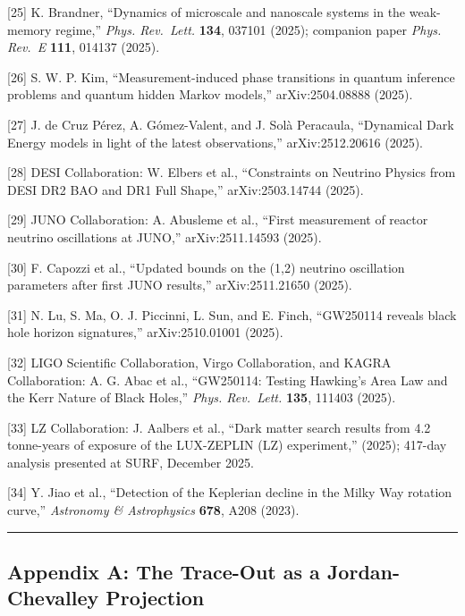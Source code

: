 \documentclass[
  11pt,
]{article}
\begin{document}
{[}25{]} K. Brandner, ``Dynamics of microscale and nanoscale systems in
the weak-memory regime,'' \emph{Phys. Rev.~Lett.} \textbf{134}, 037101
(2025); companion paper \emph{Phys. Rev.~E} \textbf{111}, 014137 (2025).

{[}26{]} S. W. P. Kim, ``Measurement-induced phase transitions in
quantum inference problems and quantum hidden Markov models,''
arXiv:2504.08888 (2025).

{[}27{]} J. de Cruz Pérez, A. Gómez-Valent, and J. Solà Peracaula,
``Dynamical Dark Energy models in light of the latest observations,''
arXiv:2512.20616 (2025).

{[}28{]} DESI Collaboration: W. Elbers et al., ``Constraints on Neutrino
Physics from DESI DR2 BAO and DR1 Full Shape,'' arXiv:2503.14744 (2025).

{[}29{]} JUNO Collaboration: A. Abusleme et al., ``First measurement of
reactor neutrino oscillations at JUNO,'' arXiv:2511.14593 (2025).

{[}30{]} F. Capozzi et al., ``Updated bounds on the (1,2) neutrino
oscillation parameters after first JUNO results,'' arXiv:2511.21650
(2025).

{[}31{]} N. Lu, S. Ma, O. J. Piccinni, L. Sun, and E. Finch, ``GW250114
reveals black hole horizon signatures,'' arXiv:2510.01001 (2025).

{[}32{]} LIGO Scientific Collaboration, Virgo Collaboration, and KAGRA
Collaboration: A. G. Abac et al., ``GW250114: Testing Hawking's Area Law
and the Kerr Nature of Black Holes,'' \emph{Phys. Rev.~Lett.}
\textbf{135}, 111403 (2025).

{[}33{]} LZ Collaboration: J. Aalbers et al., ``Dark matter search
results from 4.2 tonne-years of exposure of the LUX-ZEPLIN (LZ)
experiment,'' (2025); 417-day analysis presented at SURF, December 2025.

{[}34{]} Y. Jiao et al., ``Detection of the Keplerian decline in the
Milky Way rotation curve,'' \emph{Astronomy \& Astrophysics}
\textbf{678}, A208 (2023).

\begin{center}\rule{0.5\linewidth}{0.5pt}\end{center}

\hypertarget{appendix-a-the-trace-out-as-a-jordan-chevalley-projection}{%
\subsection{Appendix A: The Trace-Out as a Jordan-Chevalley
Projection}\label{appendix-a-the-trace-out-as-a-jordan-chevalley-projection}}
\end{document}
